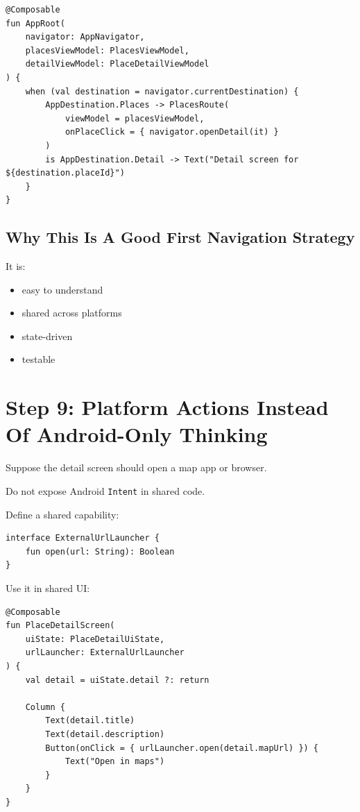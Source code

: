 \documentclass[11pt,a4paper]{article}
\begin{document}
\begin{lstlisting}[style=kazekotlin]
@Composable
fun AppRoot(
    navigator: AppNavigator,
    placesViewModel: PlacesViewModel,
    detailViewModel: PlaceDetailViewModel
) {
    when (val destination = navigator.currentDestination) {
        AppDestination.Places -> PlacesRoute(
            viewModel = placesViewModel,
            onPlaceClick = { navigator.openDetail(it) }
        )
        is AppDestination.Detail -> Text("Detail screen for ${destination.placeId}")
    }
}
\end{lstlisting}

\subsection{Why This Is A Good First Navigation Strategy}

It is:
\begin{itemize}
    \item easy to understand
    \item shared across platforms
    \item state-driven
    \item testable
\end{itemize}

\section{Step 9: Platform Actions Instead Of Android-Only Thinking}

Suppose the detail screen should open a map app or browser.

Do not expose Android \texttt{Intent} in shared code.

Define a shared capability:

\begin{lstlisting}[style=kazekotlin]
interface ExternalUrlLauncher {
    fun open(url: String): Boolean
}
\end{lstlisting}

Use it in shared UI:

\begin{lstlisting}[style=kazekotlin]
@Composable
fun PlaceDetailScreen(
    uiState: PlaceDetailUiState,
    urlLauncher: ExternalUrlLauncher
) {
    val detail = uiState.detail ?: return

    Column {
        Text(detail.title)
        Text(detail.description)
        Button(onClick = { urlLauncher.open(detail.mapUrl) }) {
            Text("Open in maps")
        }
    }
}
\end{lstlisting}
\end{document}
